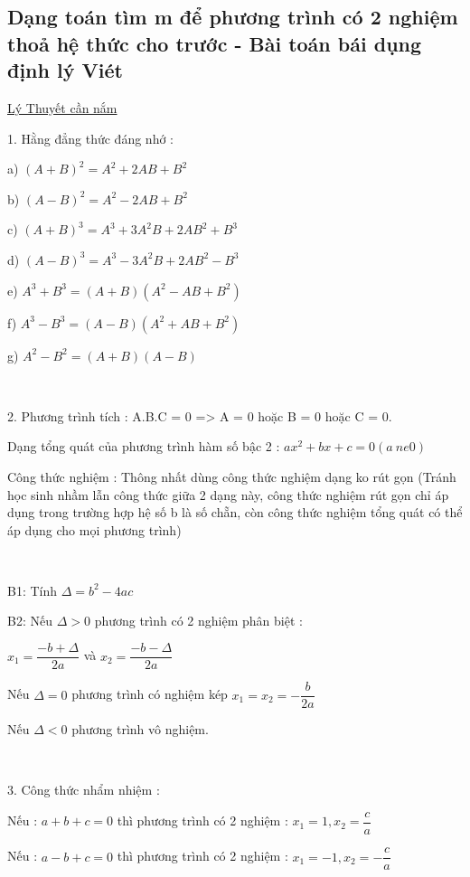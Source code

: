 \documentclass[12pt]{article}
\begin{document}
\subsection{Dạng toán tìm m để phương trình có 2 nghiệm thoả hệ thức cho trước - Bài toán bái dụng định lý Viét} \par
\underline{Lý Thuyết cần nắm} \par

1. Hằng đẳng thức đáng nhớ : \par

a) $(A + B)^2 = A^2 + 2AB + B^2$ \par
b) $(A - B)^2 = A^2 - 2AB + B^2$ \par
c) $(A + B)^3 = A^3 + 3A^2B + 2AB^2 + B^3$ \par
d) $(A - B)^3 = A^3 - 3A^2B + 2AB^2 - B^3$ \par
e) $A^3 + B^3 = (A + B)(A^2 - AB + B^2)$ \par
f) $A^3 - B^3 = (A - B)(A^2 + AB + B^2)$ \par
g) $A^2 - B^2 = (A + B)(A - B)$ \par

\   

2. Phương trình tích : A.B.C = 0 => A = 0 hoặc B = 0 hoặc C = 0. \par
Dạng tổng quát của phương trình hàm số bậc 2 : $ax^2 + bx + c = 0 (a \ ne 0)$ \par
Công thức nghiệm : Thông nhất dùng công thức nghiệm dạng ko rút gọn (Tránh học sinh nhầm lẫn công thức giữa 2 dạng này, công thức nghiệm rút gọn chỉ áp dụng trong trường hợp hệ số b là số chẵn, còn công thức nghiệm tổng quát có thể áp dụng cho mọi phương trình)\par

\   

B1: Tính $\Delta = b^2 - 4ac$ \par
B2: Nếu $\Delta > 0$ phương trình có 2 nghiệm phân biệt : \par
$x_1 = \dfrac{-b + \Delta}{2a}$ và $x_2 = \dfrac{-b - \Delta}{2a}$ \par
Nếu $\Delta = 0$ phương trình có nghiệm kép $x_1 = x_2 = -\dfrac{b}{2a}$ \par
Nếu $\Delta < 0$ phương trình vô nghiệm. \par

\    

3. Công thức nhẩm nhiệm : \par
Nếu : $a + b + c = 0$ thì phương trình có 2 nghiệm : $x_1 = 1, x_2 = \dfrac{c}{a}$ \par
Nếu : $a - b + c = 0$ thì phương trình có 2 nghiệm : $x_1 = -1, x_2 = -\dfrac{c}{a}$ \par
\end{document}
